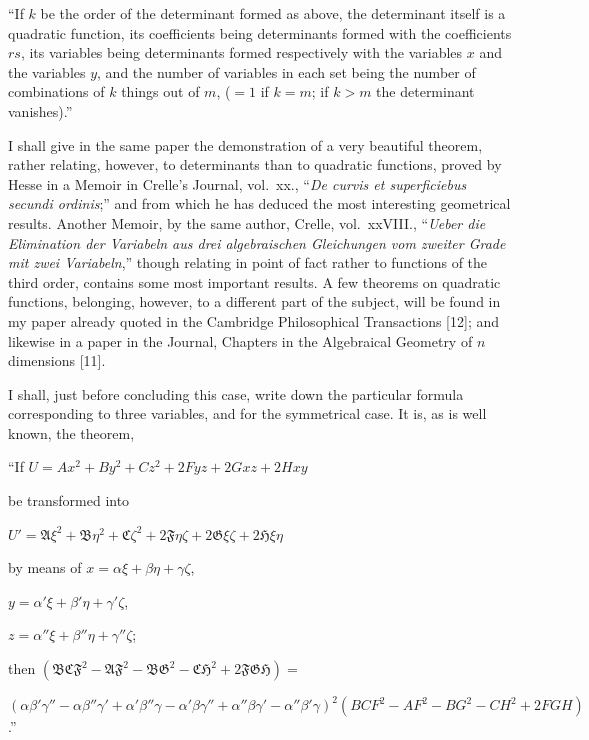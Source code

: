 \documentclass[11pt,a4paper]{article}
\theoremstyle{plain}
\theoremstyle{definition}
\theoremstyle{remark}
\begin{document}
``If $k$ be the order of the determinant formed as above, the determinant itself
is a quadratic function, its coefficients being determinants formed with the coefficients
$rs$, its variables being determinants formed respectively with the variables $x$ and the
variables $y$, and the number of variables in each set being the number of combinations
of $k$ things out of $m$, ($=1$ if $k=m$; if $k>m$ the determinant vanishes).''

I shall give in the same paper the demonstration of a very beautiful theorem,
rather relating, however, to determinants than to quadratic functions, proved by Hesse
in a Memoir in Crelle's Journal, vol.~xx., ``\textit{De curvis et superficiebus secundi ordinis};''
and from which he has deduced the most interesting geometrical results. Another
Memoir, by the same author, Crelle, vol.~xxVIII., ``\textit{Ueber die Elimination der Variabeln
aus drei algebraischen Gleichungen vom zweiter Grade mit zwei Variabeln},'' though
relating in point of fact rather to functions of the third order, contains some most
important results. A few theorems on quadratic functions, belonging, however, to a
different part of the subject, will be found in my paper already quoted in the Cambridge
Philosophical Transactions [12]; and likewise in a paper in the Journal, Chapters in
the Algebraical Geometry of $n$ dimensions [11].

I shall, just before concluding this case, write down the particular formula corresponding
to three variables, and for the symmetrical case. It is, as is well known, the
theorem,

``If $U = Ax^2 + By^2 + Cz^2 + 2Fyz + 2Gxz + 2Hxy$

be transformed into

$U' = \mathfrak{A}\xi^2 + \mathfrak{B}\eta^2 + \mathfrak{C}\zeta^2 + 2\mathfrak{F}\eta\zeta + 2\mathfrak{G}\xi\zeta + 2\mathfrak{H}\xi\eta$

by means of $x = \alpha\xi + \beta\eta + \gamma\zeta$,

$y = \alpha'\xi + \beta'\eta + \gamma'\zeta$,

$z = \alpha''\xi + \beta''\eta + \gamma''\zeta$;

then $(\mathfrak{B}\mathfrak{C}\mathfrak{F}^2 - \mathfrak{A}\mathfrak{F}^2 - \mathfrak{B}\mathfrak{G}^2 - \mathfrak{C}\mathfrak{H}^2 + 2\mathfrak{F}\mathfrak{G}\mathfrak{H}) =$

$(\alpha\beta'\gamma'' - \alpha\beta''\gamma' + \alpha'\beta''\gamma - \alpha'\beta\gamma'' + \alpha''\beta\gamma' - \alpha''\beta'\gamma)^2
(BCF^2 - AF^2 - BG^2 - CH^2 + 2FGH)$.''
\end{document}

